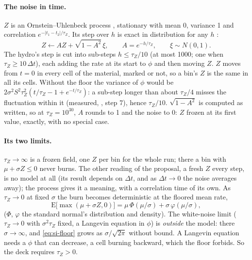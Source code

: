 \paragraph{The noise in time.} $Z$ is an Ornstein--Uhlenbeck process
\cite{uhlenbeck1930}, stationary with mean 0, variance 1 and correlation
$e^{-|t_1 - t_2|/\tau_Z}$. Its step over $h$ is exact in distribution for
any $h$ \cite{gillespie1996}:
\begin{equation}
  Z \leftarrow A Z + \sqrt{1 - A^2}\,\xi, \qquad A = e^{-h/\tau_Z},
  \qquad \xi \sim N(0, 1).
  \label{eq:si-ou}
\end{equation}
The hydro's step is cut into sub-steps $h \le \tau_Z/10$ (at most 1000; one
when $\tau_Z \ge 10\,\Delta t$), each adding the rate at its start to $\phi$
and then moving $Z$. $Z$ moves from $t = 0$ in every cell of the material,
marked or not, so a bin's $Z$ is the same in all its cells. Without the
floor the variance of $\phi$ would be $2\sigma^2S^2\tau_Z^2(t/\tau_Z - 1 +
e^{-t/\tau_Z})$: a sub-step longer than about $\tau_Z/4$ misses the
fluctuation within it (measured, , step 7),
hence $\tau_Z/10$. $\sqrt{1 - A^2}$ is computed as written, so at $\tau_Z =
10^{30}$, $A$ rounds to 1 and the noise to 0: $Z$ frozen at its first value,
exactly, with no special case.

\paragraph{Its two limits.} $\tau_Z \to \infty$ is a frozen field, one $Z$
per bin for the whole run; there a bin with $\mu + \sigma Z \le 0$ never
burns. The other reading of the proposal, a fresh $Z$ every step, is no
model at all (its result depends on $\Delta t$, and as $\Delta t \to 0$ the
noise averages away); the process gives it a meaning, with a correlation
time of its own. As $\tau_Z \to 0$ at fixed $\sigma$ the burn becomes
deterministic at the floored mean rate,
\begin{equation}
  \mathrm{E}\bigl[\max(\mu + \sigma Z, 0)\bigr]
  = \mu\,\Phi(\mu/\sigma) + \sigma\,\varphi(\mu/\sigma),
  \label{eq:si-floor}
\end{equation}
($\Phi$, $\varphi$ the standard normal's distribution and density). The
white-noise limit ($\tau_Z \to 0$ with $\sigma^2\tau_Z$ fixed, a Langevin
equation in $\phi$) is \emph{outside} the model: there $\sigma \to \infty$,
and \cref{eq:si-floor} grows as $\sigma/\sqrt{2\pi}$ without bound. A
Langevin equation needs a $\phi$ that can decrease, a cell burning backward,
which the floor forbids. So the deck requires $\tau_Z > 0$.

